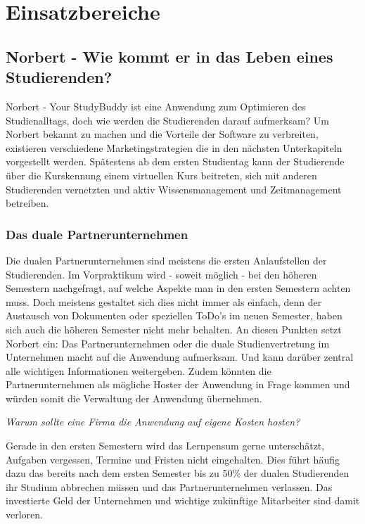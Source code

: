 
\chapter{Einsatzbereiche}
\section{Norbert - Wie kommt er in das Leben eines Studierenden?}
Norbert - Your StudyBuddy ist eine Anwendung zum Optimieren des Studienalltags, doch wie werden die Studierenden darauf aufmerksam?
Um Norbert bekannt zu machen und die Vorteile der Software zu verbreiten, existieren verschiedene Marketingstrategien die in den nächsten Unterkapiteln vorgestellt werden. Spätestens ab dem ersten Studientag kann der Studierende über die Kurskennung einem virtuellen Kurs beitreten, sich mit anderen Studierenden vernetzten und aktiv Wissensmanagement und Zeitmanagement betreiben.

\subsection{Das duale Partnerunternehmen}
Die dualen Partnerunternehmen sind meistens die ersten Anlaufstellen der Studierenden. Im Vorpraktikum wird  - soweit möglich - bei den höheren Semestern nachgefragt, auf welche Aspekte man in den ersten Semestern achten muss. Doch meistens gestaltet sich dies nicht immer als einfach, denn der Austausch von Dokumenten oder speziellen ToDo's im neuen Semester, haben sich auch die höheren Semester nicht mehr behalten. An diesen Punkten setzt Norbert ein: Das Partnerunternehmen oder die duale Studienvertretung im Unternehmen macht auf die Anwendung aufmerksam. Und kann darüber zentral alle wichtigen Informationen weitergeben. Zudem könnten die Partnerunternehmen als mögliche Hoster der Anwendung in Frage kommen und würden somit die Verwaltung der Anwendung übernehmen.

\textit{Warum sollte eine Firma die Anwendung auf eigene Kosten hosten?}

Gerade in den ersten Semestern wird das Lernpensum gerne unterschätzt, Aufgaben vergessen, Termine und Fristen nicht eingehalten. Dies führt häufig dazu das bereits nach dem ersten Semester bis zu 50\% der dualen Studierenden ihr Studium abbrechen müssen und das Partnerunternehmen verlassen. Das investierte Geld der Unternehmen und wichtige zukünftige Mitarbeiter sind damit verloren.

